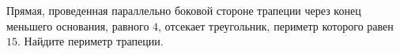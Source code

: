\begin{ex}
	\begin{condition}
		Прямая, проведенная параллельно боковой стороне трапеции через конец меньшего основания, равного \( 4 \), отсекает треугольник, периметр которого равен \( 15 \). Найдите периметр трапеции.
	\end{condition}
\end{ex}